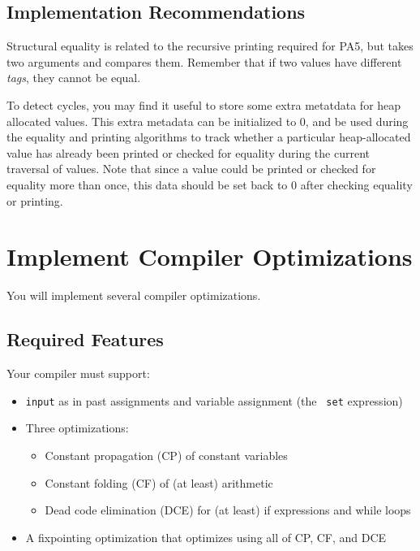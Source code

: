 \documentclass[10pt, oneside]{article}
\begin{document}
\subsection*{Implementation Recommendations}

Structural equality is related to the recursive printing required for PA5,
but takes two arguments and compares them. Remember that if two values have
different {\it tags}, they cannot be equal.

To detect cycles, you may find it useful to store some extra metatdata for
heap allocated values. This extra metadata can be initialized to 0, and be
used during the equality and printing algorithms to track whether a
particular heap-allocated value has already been printed or checked for
equality during the current traversal of values. Note that since a value
could be printed or checked for equality more than once, this data should be
set back to 0 after checking equality or printing.


\section*{Implement Compiler Optimizations}

You will implement several compiler optimizations.

\subsection*{Required Features}

Your compiler must support:

\begin{itemize}

\item {\tt input} as in past assignments and variable assignment (the {\tt
set} expression)

\item Three optimizations:

\begin{itemize}
  \item Constant propagation (CP) of constant variables

  \item Constant folding (CF) of (at least) arithmetic

  \item Dead code elimination (DCE) for (at least) if expressions and while loops

\end{itemize}

\item A fixpointing optimization that optimizes using all of CP, CF, and DCE

\end{itemize}
\end{document}

